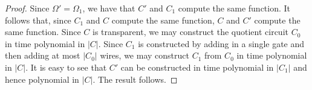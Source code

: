 \documentclass[../paper.tex]{subfiles}
\begin{document}
\begin{proof}
  Since $\Omega' = \Omega_1$, we have that $C'$ and $C_1$ compute the same
  function. It follows that, since $C_1$ and $C$ compute the same function, $C$
  and $C'$ compute the same function. Since $C$ is transparent, we may construct
  the quotient circuit $C_0$ in time polynomial in $\vert C \vert$. Since $C_1$
  is constructed by adding in a single gate and then adding at most $\vert C_0
  \vert$ wires, we may construct $C_1$ from $C_0$ in time polynomial in $\vert C
  \vert$. It is easy to see that $C'$ can be constructed in time polynomial in
  $\vert C_1 \vert$ and hence polynomial in $\vert C \vert$. The result follows.



\end{proof}
\end{document}
